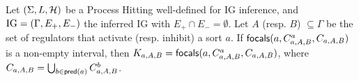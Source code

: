 \begin{comment}
We pose $\PHh_{b,A,B}$ (\eqref{eq:param_h}) the set of actions in $\PHh$ that hit a process of sort $b$ and can be fired in the previously defined context. A process of sort $b$ can be reached if it belongs to the context or if it is a bounce in $\PHh_{b,A,B}$; we call $L_{b,A,B}^?$ (\ref{eq:param_candidates}) the set of such candidates. The set of focal processes $L_{b,A,B}^*$ (\ref{eq:param_focal}) is the set of processes of $L_{b,A,B}^?$ that are not hit by an action in $\PHh_{b,A,B}$.
\begin{align}
\label{eq:param_h}
  \PHh_{b,A,B} & = \{ \PHfrappe{a_i}{b_j}{b_k} \in \PHh \mid \exists a \in \Gamma, a_i \in C_{b,A,B}^a \wedge b_j \in C_{b,A,B}^b\}
\\
\label{eq:param_candidates}
  L_{b,A,B}^? & =  C_{b,A,B}^b \cup \{ b_k\mid \exists \PHfrappe{a_i}{b_j}{b_k} \in \PHh_{b,A,B}\}
\\
\label{eq:param_focal}
  L_{b,A,B}^* & =  L_{b,A,B}^? \setminus \{ b_j \mid \exists \PHfrappe{a_i}{b_j}{b_k} \in \PHh_{b,A,B} \}
\end{align}

The focal processes in $L_{b,A,B}^*$ are the wanted parameters if they are attractors, \ie if the actions in $\PHh_{b,A,B}$ can only bounce in their direction. A set of processes is an attractor if it verifies the condition \eqref{eq:param_attractor}; in this case, this set of processes is also an interval.
\begin{align}
\label{eq:param_attractor}
  \forall \PHfrappe{b_i}{a_j}{a_k} \in \PHh_{a,A,B}, \forall a_f \in L_{a,A,B}^*, |f-k| < |f-j|
\end{align}
\end{comment}


\begin{theorem}
\label{thm:param_K}
Let $(\Sigma, L, \mathcal{H})$ be a Process Hitting well-defined for IG inference, and $\mathrm{IG} = (\Gamma,
E_+, E_-)$ the inferred IG with $E_+\cap E_-=\emptyset$.
Let $A$ (resp. $B$) $\subseteq \Gamma$ be the set of regulators that activate (resp. inhibit) a sort
$a$.
If $\mathsf{focals}(a,C^a_{a,A,B},C_{a,A,B})$ is a non-empty interval, 
	then $K_{a,A,B} = \mathsf{focals}(a, C^a_{a,A,B}, C_{a,A,B})$,
	where $C_{a,A,B} = \bigcup_{b\in\mathsf{pred}(a)} C^b_{a,A,B}$.
\end{theorem}

